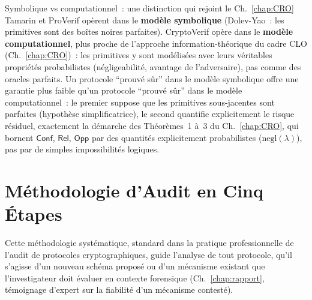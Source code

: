 \begin{boiteRemarque}{Symbolique vs computationnel~: une distinction
qui rejoint le Ch.~\ref{chap:CRO}}
Tamarin et ProVerif opèrent dans le \textbf{modèle symbolique}
(Dolev-Yao~: les primitives sont des boîtes noires parfaites).
CryptoVerif opère dans le \textbf{modèle computationnel}, plus
proche de l'approche information-théorique du cadre CLO
(Ch.~\ref{chap:CRO})~: les primitives y sont modélisées avec leurs
véritables propriétés probabilistes (négligeabilité, avantage de
l'adversaire), pas comme des oracles parfaits. Un protocole
``prouvé sûr'' dans le modèle symbolique offre une garantie plus
faible qu'un protocole ``prouvé sûr'' dans le modèle computationnel~:
le premier suppose que les primitives sous-jacentes sont parfaites
(hypothèse simplificatrice), le second quantifie explicitement le
risque résiduel, exactement la démarche des Théorèmes~1 à~3 du
Ch.~\ref{chap:CRO}, qui bornent $\mathsf{Conf}$, $\mathsf{Rel}$,
$\mathsf{Opp}$ par des quantités explicitement probabilistes
($\mathrm{negl}(\lambda)$), pas par de simples impossibilités
logiques.
\end{boiteRemarque}

\section{Méthodologie d'Audit en Cinq Étapes}
\label{sec:methodologie-audit}

Cette méthodologie systématique, standard dans la pratique
professionnelle de l'audit de protocoles cryptographiques, guide
l'analyse de tout protocole, qu'il s'agisse d'un nouveau schéma
proposé ou d'un mécanisme existant que l'investigateur doit évaluer
en contexte forensique (Ch.~\ref{chap:rapport}, témoignage
d'expert sur la fiabilité d'un mécanisme contesté).

